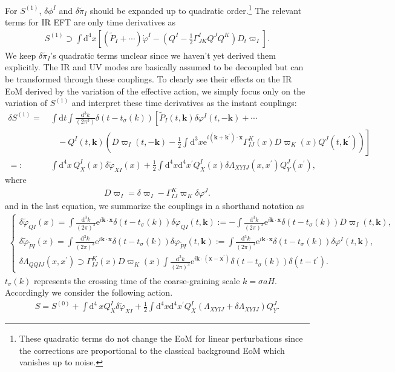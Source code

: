 \documentclass[aps, prd
, preprint
, nofootinbib 
, notitlepage
, longbibliography
]{revtex4-1}
\newcommand{\dd}{\mathrm{d}}
\newcommand{\ee}{\mathrm{e}}
\newcommand{\dps}{\displaystyle}
\newcommand{\bae}[1]{\begin{align} #1 \end{align}}
\newcommand{\bce}[1]{\begin{cases} #1 \end{cases}}
\begin{document}
For $S^{(1)}$, $\delta\phi^I$ and $\delta\tilde{\pi}_I$ should be expanded up to quadratic order.\footnote{These quadratic terms do not change the EoM for linear perturbations since the corrections are proportional to the classical background EoM which vanishes up to noise.} The relevant terms for IR EFT are only time derivatives as
\bae{
    S^{(1)}\supset\int\dd^4x\left[(\tilde{P}_I+\cdots)\dot{\varphi}^I-\left(Q^I-\frac{1}{2}\Gamma^I_{JK}Q^JQ^K\right)D_t\varpi_I\right].
}
We keep $\delta\tilde{\pi}_I$'s quadratic terms unclear since we haven't yet derived them explicitly.
The IR and UV modes are basically assumed to be decoupled but can be transformed through these couplings.
To clearly see their effects on the IR EoM derived by the variation of the effective action, we simply focus only on the variation of $S^{(1)}$ and interpret these time derivatives as the instant couplings:
\bae{
    \delta S^{(1)}=&\,\int\dd t\int\frac{\dd^3k}{(2\pi^3)}\delta(t-t_\sigma(k))\left[\tilde{P}_I(t,\mathbf{k})\delta\varphi^I(t,-\mathbf{k})+\cdots \right. \nonumber \\
    &\left.\quad-Q^I(t,\mathbf{k})\left(D\varpi_I(t,-\mathbf{k})-\frac{1}{2}\int\dd^3x\ee^{i(\mathbf{k}+\mathbf{k}^\prime)\cdot\mathbf{x}}\Gamma^K_{IJ}(x)D\varpi_K(x)Q^J(t,\mathbf{k}^\prime)\right)\right] \nonumber \\
    =:&\,\int\dd^4x\,Q^I_X(x)\delta\tilde{\varphi}_{XI}(x)+\frac{1}{2}\int\dd^4x\dd^4x^\prime Q_X^I(x)\delta\Lambda_{XYIJ}(x,x^\prime)Q^J_Y(x^\prime),
}
where
\bae{
    D\varpi_I=\delta\varpi_I-\Gamma^K_{IJ}\varpi_K\delta\varphi^J.
}
and in the last equation, we summarize the couplings in a shorthand notation as
\bae{
    \bce{
        \dps
        \delta\tilde{\varphi}_{QI}(x)=\int\frac{\dd^3k}{(2\pi)^3}\ee^{i\mathbf{k}\cdot\mathbf{x}}\delta(t-t_\sigma(k))\delta\varphi_{QI}(t,\mathbf{k})
        :=-\int\frac{\dd^3k}{(2\pi)^3}\ee^{i\mathbf{k}\cdot\mathbf{x}}\delta(t-t_\sigma(k))D\varpi_I(t,\mathbf{k}), \\ 
        \dps
        \delta\tilde{\varphi}_{\tilde{P}I}(x)=\int\frac{\dd^3k}{(2\pi)^3}\ee^{i\mathbf{k}\cdot\mathbf{x}}\delta(t-t_\sigma(k))\delta\varphi_{\tilde{P}I}(t,\mathbf{k})
        :=\int\frac{\dd^3k}{(2\pi)^3}\ee^{i\mathbf{k}\cdot\mathbf{x}}\delta(t-t_\sigma(k))\delta\varphi^I(t,\mathbf{k}), \\
        \dps
        \delta\Lambda_{QQIJ}(x,x^\prime)\supset\Gamma^K_{IJ}(x)D\varpi_K(x)\int\frac{\dd^3k}{(2\pi)^3}\ee^{i\mathbf{k}\cdot(\mathbf{x}-\mathbf{x}^\prime)}\delta(t-t_\sigma(k))\delta(t-t^\prime).
    }
}
$t_\sigma(k)$ represents the crossing time of the coarse-graining scale $k=\sigma aH$.
Accordingly we consider the following action.
\bae{
    S=S^{(0)}+\int\dd^4\,xQ_X^I\delta\tilde{\varphi}_{XI}+\frac{1}{2}\int\dd^4x\dd^4x^\prime Q^I_X(\Lambda_{XYIJ}+\delta\Lambda_{XYIJ})Q^J_Y.
}
\end{document}
